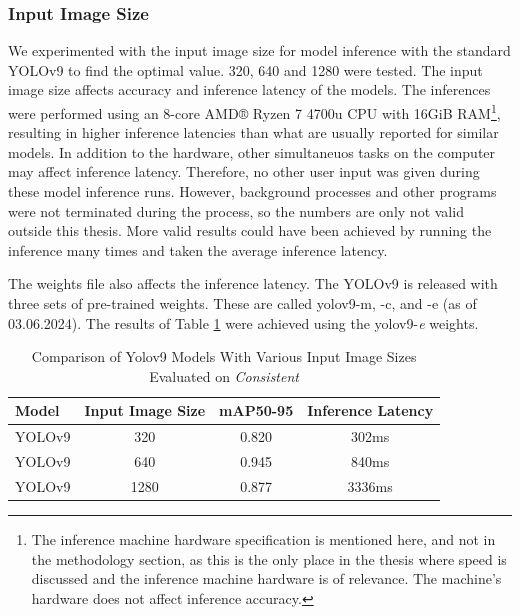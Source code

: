 \subsubsection{Input Image Size}
\label{sec:input_image_size}
We experimented with the input image size for model inference with the standard YOLOv9 to find the optimal value. 320, 640 and 1280 were tested. The input image size affects accuracy and inference latency of the models. The inferences were performed using an 8-core AMD® Ryzen 7 4700u CPU with 16GiB RAM\footnote{The inference machine hardware specification is mentioned here, and not in the methodology section, as this is the only place in the thesis where speed is discussed and the inference machine hardware is of relevance. The machine's hardware does not affect inference accuracy.}, resulting in higher inference latencies than what are usually reported for similar models. In addition to the hardware, other simultaneuos tasks on the computer may affect inference latency. Therefore, no other user input was given during these model inference runs. However, background processes and other programs were not terminated during the process, so the numbers are only not valid outside this thesis. More valid results could have been achieved by running the inference many times and taken the average inference latency. 

The weights file also affects the inference latency. The YOLOv9 is released with three sets of pre-trained weights. These are called yolov9-m, -c, and -e (as of 03.06.2024). The results of Table \ref{tab:APs_imagesize} were achieved using the yolov9-\textit{e} weights. 

\begin{table}[H]
    \centering
    \renewcommand{\arraystretch}{1.5}
    \setlength{\tabcolsep}{1em}
    \begin{tabular}{|l|c|c|c|}
        \hline
        \rowcolor{gray!25}
        \textbf{Model} & \textbf{Input Image Size}& \textbf{mAP50-95} & \textbf{Inference Latency} \\ \hline
        YOLOv9          & 320  & 0.820 & 302ms  \\ \hline
        YOLOv9          & 640  & 0.945 & 840ms  \\ \hline
        YOLOv9          & 1280 & 0.877 & 3336ms \\ \hline
    \end{tabular}
    \caption{Comparison of Yolov9 Models With Various Input Image Sizes Evaluated on \textit{Consistent}}
    \label{tab:APs_imagesize}
\end{table}

